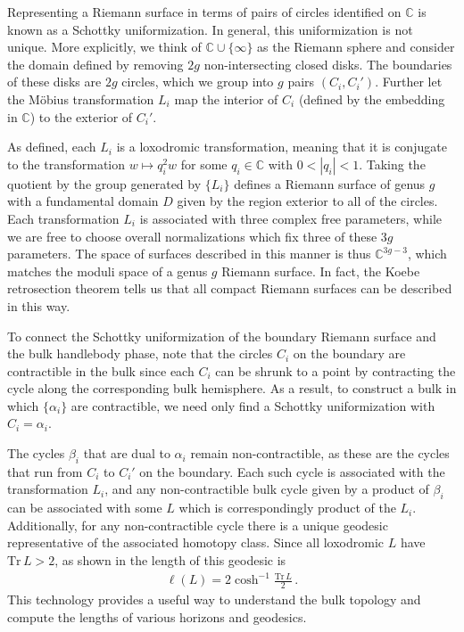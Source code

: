 \documentclass[letterpaper,12pt]{article}
\newcommand{\ban}[1]{\begin{align}#1\end{align}}
\newcommand{\Tr}{\text{Tr}}
\begin{document}
Representing a Riemann surface in terms of pairs of circles identified on $\mathbb C$ is known as a Schottky uniformization. In general, this uniformization is not unique. More explicitly, we think of $\mathbb C \cup \{\infty \}$ as the Riemann sphere and
consider the domain defined by removing $2g$ non-intersecting closed disks.  The boundaries of these disks are $2g$ circles, which we group into $g$ pairs $(C_i,C_i')$. Further let the M\"obius transformation $L_i$ map the interior of $C_i$ (defined by the embedding in $\mathbb C$) to the exterior of $C_i'$.

As defined, each $L_i$ is a loxodromic transformation, meaning that it is conjugate to the transformation $w\mapsto q_i^2 w$ for some $q_i \in \mathbb C$ with $0<|q_i|<1$. Taking the quotient by the group generated by $\{L_i\}$ defines a Riemann surface of genus $g$ with a fundamental domain $D$ given by the region exterior to all of the circles. Each transformation $L_i$ is associated with three complex free parameters, while we are free to choose overall normalizations which fix three of these $3g$ parameters. The space of surfaces described in this manner is thus $\mathbb C^{3g-3}$, which matches the moduli space of a genus $g$ Riemann surface. In fact, the Koebe retrosection theorem \cite{koebe} tells us that all compact Riemann surfaces can be described in this way.

To connect the Schottky uniformization of the boundary Riemann surface and the bulk handlebody phase, note that the circles $C_i$ on the boundary are contractible in the bulk since each $C_i$ can be shrunk to a point by contracting the cycle along the corresponding bulk hemisphere.  As a result, to construct a bulk in which $\{\alpha_i\}$ are contractible, we need only find a Schottky uniformization with $C_i = \alpha_i$.

The cycles $\beta_i$ that are dual to $\alpha_i$ remain non-contractible, as these are the cycles that run from $C_i$ to $C_i'$ on the boundary. Each such cycle is associated with the transformation $L_i$, and any non-contractible bulk cycle given by a product of $\beta_i$ can be associated with some $L$ which is correspondingly product of the $L_i$. Additionally, for any non-contractible cycle there is a unique geodesic representative of the associated homotopy class. Since all loxodromic $L$ have $\Tr\, L >2$,  as shown in \cite{Maxfield3D} the length of this geodesic is
\ban{
\ell(L) = 2 \cosh^{-1} \frac{\Tr \,L}{2} \, \label{eq:geodL}.
}
This technology provides a useful way to understand the bulk topology and compute the lengths of various horizons and geodesics.
\end{document}
